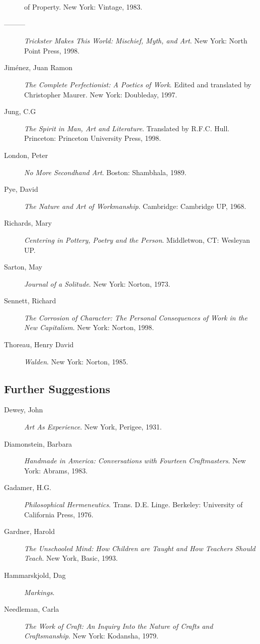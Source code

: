 \documentclass[letterpaper,10pt,headsepline]{scrreprt}
\begin{document}
\begin{description}
{    of Property}. New York: Vintage, 1983.
\item [---------] \textit{Trickster Makes This World: Mischief, Myth,
    and Art}. New York: North Point Press, 1998.
\item [Jim\'enez, Juan Ramon] \textit{The Complete Perfectionist: A
    Poetics of Work}. Edited and translated by Christopher Maurer. New
  York: Doubleday, 1997.
\item [Jung, C.G] \textit{The Spirit in Man, Art and Literature}.
  Translated by R.F.C. Hull. Princeton: Princeton University Press,
  1998.
\item [London, Peter] \textit{No More Secondhand Art}. Boston:
  Shambhala, 1989.
\item [Pye, David] \textit{The Nature and Art of Workmanship}.
  Cambridge: Cambridge UP, 1968.
\item [Richards, Mary] \textit{Centering in Pottery, Poetry and the
    Person}. Middletwon, CT: Wesleyan UP.
\item [Sarton, May] \textit{Journal of a Solitude}. New York: Norton,
  1973.
\item [Sennett, Richard] \textit{The Corrosion of Character: The
    Personal Consequences of Work in the New Capitalism}. New York:
  Norton, 1998.
\item [Thoreau, Henry David] \textit{Walden}. New York: Norton, 1985.
\end{description}


\subsection{Further Suggestions}

\begin{description}

\item [Dewey, John] \textit{Art As Experience}. New York, Perigee, 1931.
\item [Diamonstein, Barbara] \textit{Handmade in America: Conversations with Fourteen Craftmasters}. New York: Abrams, 1983.
\item [Gadamer, H.G.] \textit{Philosophical Hermeneutics}. Trans. D.E. Linge. Berkeley: University of California Press, 1976.
\item [Gardner, Harold] \textit{The Unschooled Mind: How Children are Taught and How Teachers Should Teach}. New York, Basic, 1993.
\item [Hammarskjold, Dag] \textit{Markings}.
\item [Needleman, Carla] \textit{The Work of Craft: An Inquiry Into the Nature of Crafts and Craftsmanship}. New York: Kodansha, 1979.

\end{description}
\end{document}

